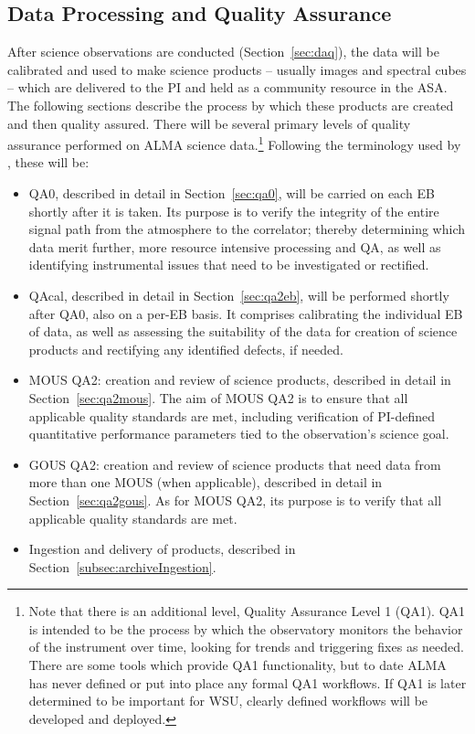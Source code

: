 \subsection{Data Processing and Quality Assurance}
\label{sec:dpqa}
After science observations are conducted (Section~\ref{sec:daq}), the data will be calibrated and used to make science products -- usually images and spectral cubes -- which are delivered to the PI and held as a community resource in the \ac{ASA}. The following sections describe the process by which these products are created and then quality assured.  There will be  several primary levels of quality  assurance performed on ALMA science data.\footnote{Note that there is an additional level, 
Quality Assurance Level 1 (QA1). QA1 is intended to be the
process by which the observatory monitors the behavior of 
the instrument over time, looking for trends and triggering 
fixes as needed. There are some tools which provide QA1 
functionality, but to date ALMA has never defined or 
put into place any formal QA1 workflows. If QA1 is later
determined to be important for WSU, clearly defined 
workflows will be developed and deployed.}  Following the terminology
used by \cite{dpomrTsi}, these will be: 
 
\begin{itemize}[itemsep=-0.5em]
\item QA0, described in detail  in Section~\ref{sec:qa0}, will be carried on each \ac{EB} shortly after it is taken. Its purpose is to verify the integrity of the 
entire signal path from the atmosphere to the correlator; 
thereby determining which data merit further, more resource 
intensive processing and \ac{QA}, as well as identifying 
instrumental issues that need to be investigated or 
rectified. 
\item QAcal,  described in detail in Section~\ref{sec:qa2eb}, will be performed shortly after QA0, also on a per-EB basis. It  comprises calibrating the individual \ac{EB} of data, as well as assessing the suitability of the data for creation of science products and rectifying any identified defects, if  needed.
\item \ac{MOUS} QA2: creation and review of science products, described in detail in Section~\ref{sec:qa2mous}. The aim of \ac{MOUS} QA2 is to
ensure that all applicable quality standards are met, including verification of PI-defined quantitative performance parameters
tied to the observation's science goal. 
\item \ac{GOUS} QA2: creation and review of  science products that need data from more than one MOUS (when applicable), described in detail in Section~\ref{sec:qa2gous}.
As for \ac{MOUS} QA2, its purpose is to verify that all applicable quality standards are met.
\item Ingestion and delivery of products, described in Section~\ref{subsec:archiveIngestion}.
\end{itemize}


